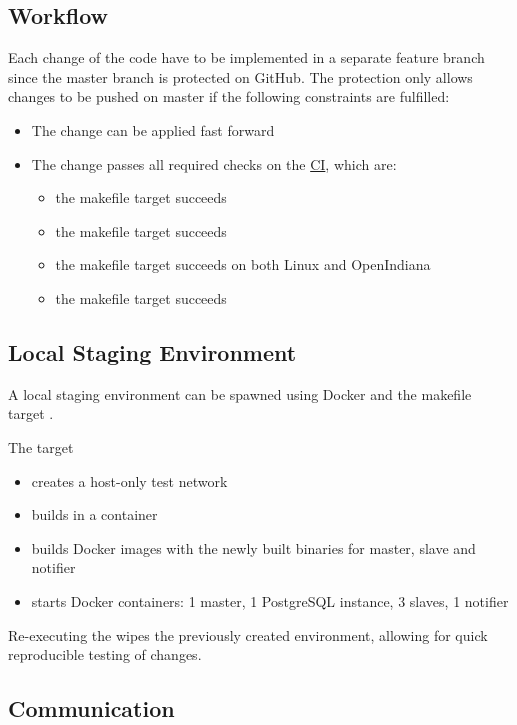 \subsection{Workflow}
Each change of the code have to be implemented in a separate feature branch since the master branch is protected on GitHub. The protection 
only allows changes to be pushed on master if the following constraints are fulfilled:
\begin{itemize}
	\item The change can be applied fast forward
	\item The change passes all required checks on the \hyperref[ci]{CI}, which are:
	\begin{itemize}
		\item the  makefile target succeeds
		\item the  makefile target succeeds
		\item the  makefile target succeeds on both Linux and OpenIndiana
		\item the  makefile target succeeds
	\end{itemize}
\end{itemize}

\subsection{Local Staging Environment}
A local staging environment can be spawned using Docker and the makefile target .

The target
\begin{itemize}
  \item creates a host-only test network
  \item builds \mamid in a container
  \item builds Docker images with the newly built binaries for master, slave and notifier
  \item starts Docker containers: 1 master, 1 PostgreSQL instance, 3 slaves, 1 notifier
\end{itemize}

Re-executing the  wipes the previously created environment, allowing for quick reproducible testing of changes.

\subsection{Communication}

